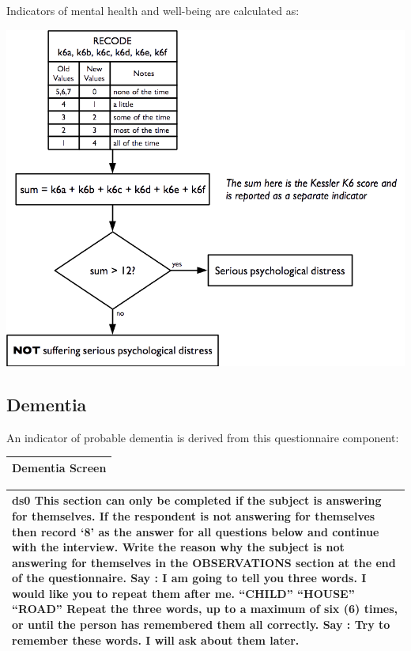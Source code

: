 \documentclass[12pt,a4paper]{book}
\theoremstyle{definition}
\theoremstyle{definition}
\theoremstyle{definition}
\theoremstyle{remark}
\begin{document}
Indicators of mental health and well-being are calculated as:

\begin{center}\includegraphics{figures/indicators19} \end{center}

\hypertarget{dementia}{%
\subsection{Dementia}\label{dementia}}

An indicator of probable dementia is derived from this questionnaire
component:

\begin{longtable}[]{@{}c@{}}
\toprule
\begin{minipage}[t]{0.97\columnwidth}\centering
\textbf{Dementia Screen}\strut
\end{minipage}\tabularnewline
\bottomrule
\end{longtable}

\begin{longtable}[]{@{}l@{}}
\toprule
\begin{minipage}[t]{0.97\columnwidth}\raggedright
ds0 \textbar{} This section can only be completed if the subject is
answering for themselves. \textbar{} \textbar{} If the respondent is not
answering for themselves then record `8' as the answer for all
\textbar{} questions below and continue with the interview. Write the
reason why the subject is not \textbar{} answering for themselves in the
OBSERVATIONS section at the end of the questionnaire. \textbar{}
\textbar{} Say : \textbar{} \textbar{} I am going to tell you three
words. \textbar{} \textbar{} I would like you to repeat them after me.
\textbar{} \textbar{} ``CHILD'' \textbar{} \textbar{} ``HOUSE''
\textbar{} \textbar{} ``ROAD'' \textbar{} \textbar{} Repeat the three
words, up to a maximum of six (6) times, or until the person has
\textbar{} remembered them all correctly. \textbar{} \textbar{} Say :
\textbar{} \textbar{} Try to remember these words. I will ask about them
later.\strut
\end{minipage}\tabularnewline
\bottomrule
\end{longtable}
\end{document}

